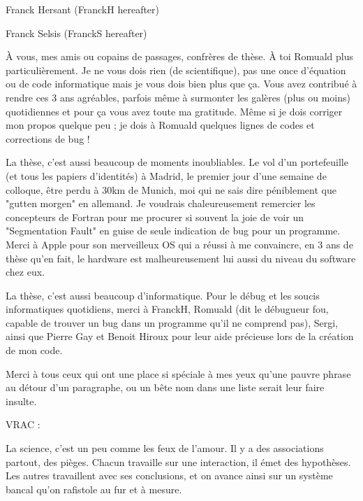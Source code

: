 Franck Hersant (FranckH hereafter)


Franck Selsis (FranckS hereafter)


À vous, mes amis ou copains de passages, confrères de thèse. À toi Romuald plus particulièrement. Je ne vous dois rien (de scientifique), pas une once d'équation ou de code informatique mais je vous dois bien plus que ça. Vous avez contribué à rendre ces 3 ans agréables, parfois même à surmonter les galères (plus ou moins) quotidiennes et pour ça vous avez toute ma gratitude. Même si je dois corriger mon propos quelque peu ; je dois à Romuald quelques lignes de codes et corrections de bug !


La thèse, c'est aussi beaucoup de moments inoubliables. Le vol d'un portefeuille (et tous les papiers d'identités) à Madrid, le premier jour d'une semaine de colloque, être perdu à 30km de Munich, moi qui ne sais dire péniblement que "gutten morgen" en allemand. Je voudrais chaleureusement remercier les concepteurs de Fortran pour me procurer si souvent la joie de voir un "Segmentation Fault" en guise de seule indication de bug pour un programme. Merci à Apple pour son merveilleux OS qui a réussi à me convaincre, en 3 ans de thèse qu'en fait, le hardware est malheureusement lui aussi du niveau du software chez eux. 

La thèse, c'est aussi beaucoup d'informatique. Pour le débug et les soucis informatiques quotidiens, merci à FranckH, Romuald (dit le débugueur fou, capable de trouver un bug dans un programme qu'il ne comprend pas), Sergi, ainsi que Pierre Gay et Benoit Hiroux pour leur aide précieuse lors de la création de mon code. 



Merci à tous ceux qui ont une place si spéciale à mes yeux qu'une pauvre phrase au détour d'un paragraphe, ou un bête nom dans une liste serait leur faire insulte. 


VRAC : 

La science, c'est un peu comme les feux de l'amour. Il y a des associations partout, des pièges. Chacun travaille sur une interaction, il émet des hypothèses. Les autres travaillent avec ses conclusions, et on avance ainsi sur un système bancal qu'on rafistole au fur et à mesure.

